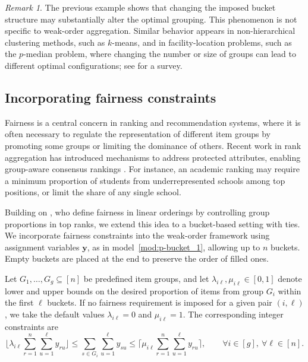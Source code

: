 \documentclass[pdflatex,basic,Numbered]{jnl}%
\theoremstyle{plain}
\theoremstyle{remark}
\newtheorem{remark}{Remark}
\theoremstyle{thmstyleone}%
\theoremstyle{thmstylethree}%
\begin{document}
\begin{remark}
The previous example shows that changing the imposed bucket structure may substantially alter the optimal grouping. This phenomenon is not specific to weak-order aggregation. Similar behavior appears in non-hierarchical clustering methods, such as \(k\)-means, and in facility-location problems, such as the \(p\)-median problem, where changing the number or size of groups can lead to different optimal configurations; see \cite{laporte2019location} for a survey.
\end{remark}

\subsection{Incorporating fairness constraints} \label{sec:fairness}

Fairness is a central concern in ranking and recommendation systems, where it is often necessary to regulate the representation of different item groups by promoting some groups or limiting the dominance of others. Recent work in rank aggregation has introduced mechanisms to address protected attributes, enabling group-aware consensus rankings \citep{chakraborty2022fair,pitoura2022fairness}. For instance, an academic ranking may require a minimum proportion of students from underrepresented schools among top positions, or limit the share of any single school.

Building on \cite{chakraborty2025improved}, who define fairness in linear orderings by controlling group proportions in top ranks, we extend this idea to a bucket-based setting with ties. We incorporate fairness constraints into the weak-order framework using assignment variables \(\bm{y}\), as in model~\eqref{mod:p-bucket_1}, allowing up to \(n\) buckets. Empty buckets are placed at the end to preserve the order of filled ones.

Let \(G_1,\dots,G_g\subseteq[n]\) be predefined item groups, and let \(\lambda_{i\ell},\mu_{i\ell}\in[0,1]\) denote lower and upper bounds on the desired proportion of items from group \(G_i\) within the first \(\ell\) buckets. If no fairness requirement is imposed for a given pair \((i,\ell)\), we take the default values \(\lambda_{i\ell}=0\) and \(\mu_{i\ell}=1\). The corresponding integer constraints are
\begin{equation}\label{eq:fairness_integer}
\biggl\lfloor 
\lambda_{i\ell}\sum_{r=1}^n\sum_{u=1}^{\ell}y_{ru}
\biggr\rfloor
\le
\sum_{s\in G_i}\sum_{u=1}^{\ell}y_{su}
\le
\biggl\lceil 
\mu_{i\ell}\sum_{r=1}^n\sum_{u=1}^{\ell}y_{ru}
\biggr\rceil,
\qquad
\forall i\in[g],\ \forall \ell\in[n].
\end{equation}
\end{document}
